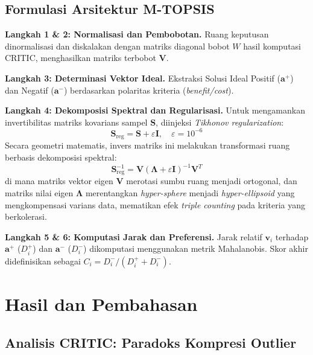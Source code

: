 \documentclass[10pt, a4paper, twocolumn]{article}
\begin{document}
\subsection{Formulasi Arsitektur M-TOPSIS}

\textbf{Langkah 1 \& 2: Normalisasi dan Pembobotan.} 
Ruang keputusan dinormalisasi dan diskalakan dengan matriks diagonal bobot $W$ hasil komputasi CRITIC, menghasilkan matriks terbobot $\mathbf{V}$.

\textbf{Langkah 3: Determinasi Vektor Ideal.} 
Ekstraksi Solusi Ideal Positif ($\mathbf{a}^+$) dan Negatif ($\mathbf{a}^-$) berdasarkan polaritas kriteria (\textit{benefit/cost}).

\textbf{Langkah 4: Dekomposisi Spektral dan Regularisasi.} 
Untuk mengamankan invertibilitas matriks kovarians sampel $\mathbf{S}$, diinjeksi \textit{Tikhonov regularization}:
\begin{equation}
\mathbf{S}_{\text{reg}} = \mathbf{S} + \varepsilon \mathbf{I}, \quad \varepsilon = 10^{-6}
\end{equation}
Secara geometri matematis, invers matriks ini melakukan transformasi ruang berbasis dekomposisi spektral:
\begin{equation}
\mathbf{S}_{\text{reg}}^{-1} = \mathbf{V} (\mathbf{\Lambda} + \varepsilon\mathbf{I})^{-1} \mathbf{V}^T
\end{equation}
di mana matriks vektor eigen $\mathbf{V}$ merotasi sumbu ruang menjadi ortogonal, dan matriks nilai eigen $\mathbf{\Lambda}$ merentangkan \textit{hyper-sphere} menjadi \textit{hyper-ellipsoid} yang mengkompensasi varians data, mematikan efek \textit{triple counting} pada kriteria yang berkolerasi.

\textbf{Langkah 5 \& 6: Komputasi Jarak dan Preferensi.} 
Jarak relatif $\mathbf{v}_i$ terhadap $\mathbf{a}^+$ ($D_i^+$) dan $\mathbf{a}^-$ ($D_i^-$) dikomputasi menggunakan metrik Mahalanobis. Skor akhir didefinisikan sebagai $C_i = D_i^- / (D_i^+ + D_i^-)$.

\section{Hasil dan Pembahasan}

\subsection{Analisis CRITIC: Paradoks Kompresi Outlier}
\end{document}
